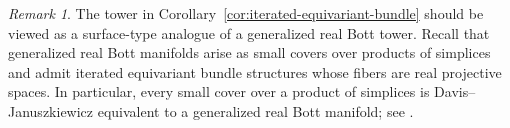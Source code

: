 \documentclass{amsart}
\numberwithin{equation}{section}
\theoremstyle{definition}
\theoremstyle{remark}
\newtheorem{remark}[theorem]{Remark}
\begin{document}
\begin{remark}
    The tower in Corollary~\ref{cor:iterated-equivariant-bundle} should be viewed as a surface-type analogue of a generalized real Bott tower.
    Recall that generalized real Bott manifolds arise as small covers over products of simplices and admit iterated equivariant bundle structures whose fibers are real projective spaces.
    In particular, every small cover over a product of simplices is Davis--Januszkiewicz equivalent to a generalized real Bott manifold; see \cite{Choi-Masuda-Suh2010Quasitoric}.
\end{remark}

%
%

\providecommand{\bysame}{\leavevmode\hbox to3em{\hrulefill}\thinspace}
\providecommand{\MR}{\relax\ifhmode\unskip\space\fi MR }
\providecommand{\MRhref}[2]{%
  \href{http://www.ams.org/mathscinet-getitem?mr=#1}{#2}
}
\providecommand{\href}[2]{#2}
\end{document}
